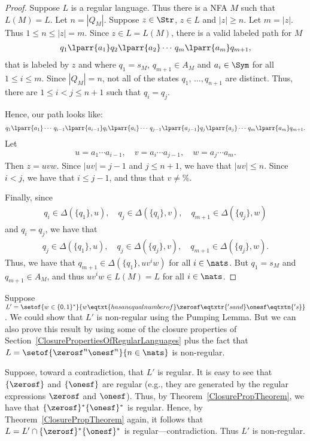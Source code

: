 \begin{proof}
Suppose $L$ is a regular
language.  Thus there is a NFA $M$ such that $L(M)=L$.  Let
$n=|Q_M|$.  Suppose $z\in\Str$, $z\in L$ and $|z|\geq n$.  Let
$m=|z|$.  Thus $1\leq n\leq|z|=m$.
Since $z\in L=L(M)$, there is a valid labeled path for $M$
\begin{gather*}
q_1\lparr{a_1}q_2\lparr{a_2}\cdots\,q_m\lparr{a_m}q_{m+1} ,
\end{gather*}
that is labeled by $z$ and where
$q_1=s_M$, $q_{m+1}\in A_M$ and $a_i\in\Sym$ for all $1\leq
i\leq m$.  Since $|Q_M|=n$,
not all of the states $q_1,\,\ldots,q_{n+1}$ are
distinct.  Thus, there are $1\leq i<j\leq n+1$ such that
$q_i=q_j$.

Hence, our path looks like:
\begin{gather*}
q_1\lparr{a_1}\cdots\,q_{i-1}\lparr{a_{i-1}}q_i
\lparr{a_i}\cdots\,q_{j-1}\lparr{a_{j-1}}q_j
\lparr{a_j}\cdots\,q_m\lparr{a_m}q_{m+1} .
\end{gather*}
Let
\begin{gather*}
u=a_1\cdots a_{i-1},\quad v=a_i\cdots a_{j-1},\quad
w=a_j\cdots a_m .
\end{gather*}
Then $z=uvw$.  Since $|uv|=j-1$ and $j\leq n+1$,
we have that $|uv|\leq n$.  Since $i<j$, we have that $i\leq j-1$,
and thus that $v\neq\%$.

Finally, since
\begin{gather*}
q_i\in\Delta(\{q_1\},u),\quad q_j\in\Delta(\{q_i\},v),\quad
q_{m+1}\in\Delta(\{q_j\},w)
\end{gather*}
and $q_i=q_j$, we have that
\begin{gather*}
q_j\in\Delta(\{q_1\},u),\quad q_j\in\Delta(\{q_j\},v),\quad
q_{m+1}\in\Delta(\{q_j\},w) .
\end{gather*}
Thus, we have that
$q_{m+1}\in\Delta(\{q_1\},uv^iw)$ for all $i\in\nats$.  But
$q_1=s_M$ and $q_{m+1}\in A_M$, and thus $uv^iw\in L(M)=L$ for all $i\in\nats$.
\end{proof}

Suppose $L'=\setof{w\in\mathsf{\{0,1\}^*}}{w\eqtxt{has an equal number of}
\zerosf\eqtxtr{'s and}\onesf\eqtxtn{'s}}$.
We could show that $L'$ is non-regular using the Pumping Lemma.
But we can also prove this result by using some of the closure
properties of Section~\ref{ClosurePropertiesOfRegularLanguages}
plus the fact that
$L=\setof{\zerosf^n\onesf^n}{n\in\nats}$ is non-regular.

Suppose, toward a contradiction, that $L'$ is regular.  It is easy to
see that $\{\zerosf\}$ and $\{\onesf\}$ are regular (e.g., they are
generated by the regular expressions $\zerosf$ and $\onesf$).  Thus,
by Theorem~\ref{ClosurePropTheorem}, we have that
$\{\zerosf\}^*\{\onesf\}^*$ is regular.  Hence, by
Theorem~\ref{ClosurePropTheorem} again, it follows that
$L=L'\cap\{\zerosf\}^*\{\onesf\}^*$ is regular---contradiction.  Thus
$L'$ is non-regular.

